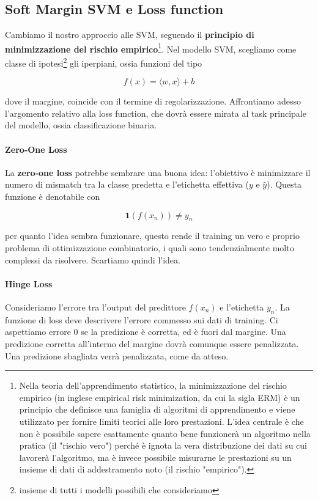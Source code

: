 \subsection{Soft Margin SVM e Loss function}
Cambiamo il nostro approccio alle SVM, seguendo il \textbf{principio di minimizzazione del rischio empirico}\footnote{Nella teoria dell'apprendimento statistico, la minimizzazione del rischio empirico (in inglese empirical risk minimization, da cui la sigla ERM) è un principio che definisce una famiglia di algoritmi di apprendimento e viene utilizzato per fornire limiti teorici alle loro prestazioni.
L'idea centrale è che non è possibile sapere esattamente quanto bene funzionerà un algoritmo nella pratica (il "rischio vero") perché è ignota la vera distribuzione dei dati su cui lavorerà l'algoritmo, ma è invece possibile misurarne le prestazioni su un insieme di dati di addestramento noto (il rischio "empirico").}. 
Nel modello SVM, scegliamo come classe di ipotesi\footnote{insieme di tutti i modelli possibili che consideriamo} gli iperpiani, ossia funzioni del tipo

$$f(x) = \langle w, x \rangle + b$$

dove il margine, coincide con il termine di regolarizzazione. Affrontiamo adesso l'argomento relativo alla loss function, che dovrà essere mirata al task principale del modello, ossia classificazione binaria. 

\paragraph{Zero-One Loss}
La \textbf{zero-one loss} potrebbe sembrare una buona idea: l'obiettivo è minimizzare il numero di mismatch tra la classe predetta e l'etichetta effettiva ($y$ e $\hat{y}$). Questa funzione è denotabile con

$$
\textbf{1}(f(x_n)) \neq y_n
$$

per quanto l'idea sembra funzionare, questo rende il training un vero e proprio problema di ottimizzazione combinatorio, i quali sono tendenzialmente molto complessi da risolvere. Scartiamo quindi l'idea.

\paragraph{Hinge Loss} Consideriamo l'errore tra l'output del predittore $f(x_n)$ e l'etichetta $y_n$. La funzione di loss deve descrivere l'errore commesso sui dati di training. Ci aspettiamo errore 0 se la predizione è corretta, ed è fuori dal margine. Una predizione corretta all'interno del margine dovrà comunque essere penalizzata. Una predizione sbagliata verrà penalizzata, come da atteso.

